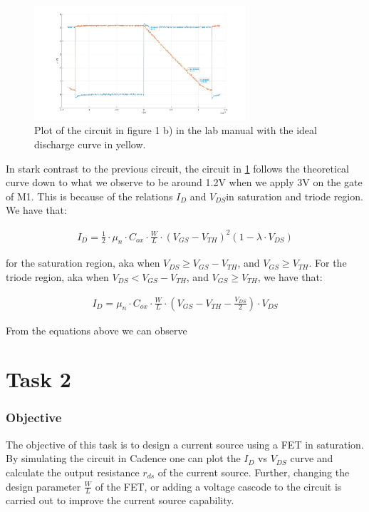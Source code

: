 \documentclass[onecolumn]{article}
\begin{document}
\begin{figure}[h!]
    \centering
    \includegraphics[width=0.7\textwidth]{1b.jpg}
    \caption{Plot of the circuit in figure 1 b) in the lab manual with the ideal discharge curve in yellow.}
    \label{fig:task1b}
\end{figure}

In stark contrast to the previous circuit, the circuit in \ref{fig:task1b} follows the theoretical curve down to what we observe to be around 1.2V when we apply 3V on the gate of M1. This is because of the relations $I_D$ and $V_{DS}$in saturation and triode region. We have that:

\begin{align}
    I_D = \frac{1}{2} \cdot \mu_n \cdot C_{ox} \cdot \frac{W}{L} \cdot (V_{GS} - V_{TH})^2(1 - \lambda \cdot V_{DS})
\end{align}

for the saturation region, aka when $V_{DS} \geq V_{GS} - V_{TH}$, and $V_{GS} \geq V_{TH}$. For the triode region, aka when $V_{DS} \lt V_{GS} - V_{TH}$, and $V_{GS} \geq V_{TH}$, we have that:

\begin{align}
    I_D = \mu_n \cdot C_{ox} \cdot \frac{W}{L} \cdot (V_{GS} - V_{TH} - \frac{V_{DS}}{2}) \cdot V_{DS}
\end{align}

From the equations above we can observe 

\section{Task 2}

\subsubsection*{Objective}
The objective of this task is to design a current source using a FET in saturation. By simulating the circuit in Cadence one can plot the $I_D$ vs $V_{DS}$ curve and calculate the output resistance $r_{ds}$ of the current source. Further, changing the design parameter $\frac{W}{L}$ of the FET, or adding a voltage cascode to the circuit is carried out to improve the current source capability.
\end{document}
